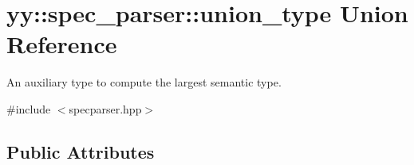 \hypertarget{unionyy_1_1spec__parser_1_1union__type}{}\section{yy\+:\+:spec\+\_\+parser\+:\+:union\+\_\+type Union Reference}
\label{unionyy_1_1spec__parser_1_1union__type}


An auxiliary type to compute the largest semantic type.  




{\ttfamily \#include $<$specparser.\+hpp$>$}

\subsection*{Public Attributes}
